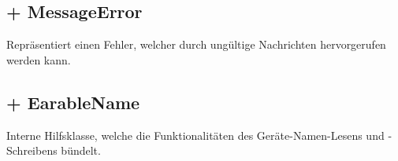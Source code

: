 \documentclass[../implementierung.tex]{subfiles}
\begin{document}
\subsection{+ MessageError}
	Repräsentiert einen Fehler, welcher durch ungültige Nachrichten hervorgerufen werden kann.

\subsection{+ EarableName}
	Interne Hilfsklasse, welche die Funktionalitäten des Geräte-Namen-Lesens und -Schreibens bündelt.
\end{document}
